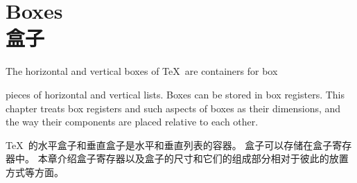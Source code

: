 
\endofchapter
\chapter{Boxes\\盒子}\label{boxes}

The horizontal and vertical boxes of \TeX\ are containers for
\term box\par
pieces of horizontal and vertical lists.
Boxes can be stored in box registers. 
This chapter treats box registers and such
aspects of boxes as their dimensions, and the way their components
are placed relative to each other.

\TeX\ 的水平盒子和垂直盒子是水平和垂直列表的容器。
盒子可以存储在盒子寄存器中。
本章介绍盒子寄存器以及盒子的尺寸和它们的组成部分相对于彼此的放置方式等方面。

